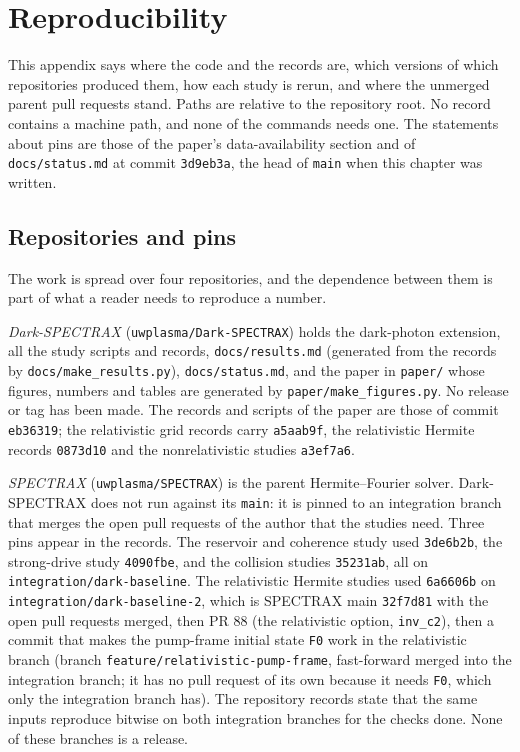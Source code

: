 \chapter{Reproducibility}\label{app:repro}

This appendix says where the code and the records are, which versions of which repositories produced them, how each study is rerun, and where the unmerged parent pull requests stand. Paths are relative to the repository root. No record contains a machine path, and none of the commands needs one. The statements about pins are those of the paper's data-availability section and of \texttt{docs/status.md} at commit \texttt{3d9eb3a}, the head of \texttt{main} when this chapter was written.

\section{Repositories and pins}

The work is spread over four repositories, and the dependence between them is part of what a reader needs to reproduce a number.

\emph{Dark-SPECTRAX} (\texttt{uwplasma/Dark-SPECTRAX}) holds the dark-photon extension, all the study scripts and records, \texttt{docs/results.md} (generated from the records by \texttt{docs/make\_results.py}), \texttt{docs/status.md}, and the paper in \texttt{paper/} whose figures, numbers and tables are generated by \texttt{paper/make\_figures.py}. No release or tag has been made. The records and scripts of the paper are those of commit \texttt{eb36319}; the relativistic grid records carry \texttt{a5aab9f}, the relativistic Hermite records \texttt{0873d10} and the nonrelativistic studies \texttt{a3ef7a6}.

\emph{SPECTRAX} (\texttt{uwplasma/SPECTRAX}) is the parent Hermite--Fourier solver. Dark-SPECTRAX does not run against its \texttt{main}: it is pinned to an integration branch that merges the open pull requests of the author that the studies need. Three pins appear in the records. The reservoir and coherence study used \texttt{3de6b2b}, the strong-drive study \texttt{4090fbe}, and the collision studies \texttt{35231ab}, all on \texttt{integration/dark-baseline}. The relativistic Hermite studies used \texttt{6a6606b} on \texttt{integration/dark-baseline-2}, which is SPECTRAX main \texttt{32f7d81} with the open pull requests merged, then PR 88 (the relativistic option, \texttt{inv\_c2}), then a commit that makes the pump-frame initial state \texttt{F0} work in the relativistic branch (branch \texttt{feature/relativistic-pump-frame}, fast-forward merged into the integration branch; it has no pull request of its own because it needs \texttt{F0}, which only the integration branch has). The repository records state that the same inputs reproduce bitwise on both integration branches for the checks done. None of these branches is a release.

